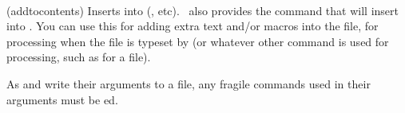 \begin{syntax}
\cmd{\addtocontents} \\
\end{syntax}
\glossary(addtocontents)%
  {}%
  {Inserts  into  (\prtoc, etc).}
    \ltx\ also provides the \cmd{\addtocontents}
 command that will insert  into . You can use
 this for adding extra text and/or macros into the file, for processing
 when the file is typeset by \cmd{\tableofcontents} (or whatever other
 command is used for  processing, such as \cmd{\listoftables}
 for a  file).

 As \cmd{\addcontentsline} and \cmd{\addtocontents} write their arguments to a
 file, any fragile commands used in their arguments must be \cmd{\protect}ed.
 
